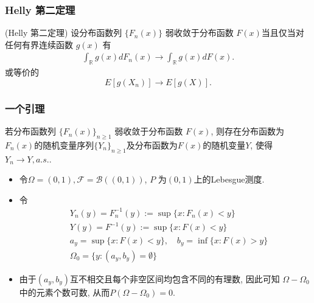 \begin{frame}
	\frametitle{{\rm Helly} 第二定理}
	\begin{thm}
		({\rm Helly} 第二定理) 设分布函数列 $\{F_n(x)\}$ 弱收敛于分布函数 $F (x)$当且仅当对任何有界连续函数 $g(x)$ 有
		\begin{eqnarray*}
			\int_{\mathbb{R}}g(x)dF_n(x)\rightarrow\int_{\mathbb{R}}g(x)dF(x).
		\end{eqnarray*}
		或等价的\pause
		\[E[g(X_n)]\rightarrow E[g(X)].\]
	\end{thm}

\end{frame}

\begin{frame}
	\frametitle{一个引理}
	\begin{thm}
		若分布函数列 $\{F_n(x)\}_{n\geq 1}$ 弱收敛于分布函数 $F (x)$, 则存在分布函数为$F_n(x)$的随机变量序列$\{Y_n\}_{n\geq 1}$及分布函数为$F(x)$的随机变量$Y$, 使得$Y_n\rightarrow Y, a.s.$.
	\end{thm}\pause

	\zheng %
		\begin{itemize}[<+-|alert@+>]
		\item 令$\Omega=(0,1), \mathcal{F}=\mathcal{B}((0,1))$, $P$ 为$(0,1)$上的Lebesgue测度.
		\item 令
		\begin{align*}
			&Y_{n}(y)=F_n^{-1}(y):=\sup \{x: F_{n}(x)<y\}\\
			&Y(y)=F^{-1}(y):=\sup \{x: F(x)<y\}\\
			&a_{y}=\sup \{x: F(x)<y\}, \quad b_{y}=\inf \{x: F(x)>y\}\\
			&\Omega_0=\{y:\left(a_{y}, b_{y}\right)=\emptyset\}
		\end{align*}
		 \item  由于$\left(a_{y}, b_{y}\right)$互不相交且每个非空区间均包含不同的有理数, 因此可知 $\Omega-\Omega_0$ 中的元素个数可数, 从而$P(\Omega-\Omega_0)=0$.

		\end{itemize}


\end{frame}


